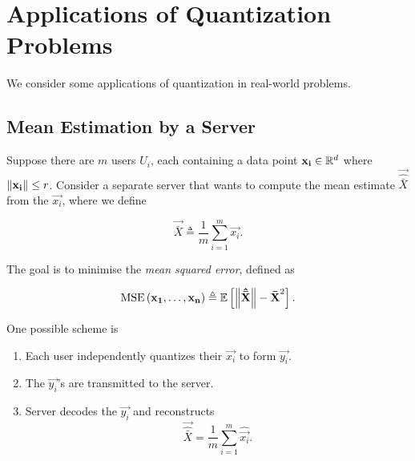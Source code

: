 \documentclass[twoside]{article}
\begin{document}



\section{Applications of Quantization Problems}

We consider some applications of quantization in real-world problems.

\subsection{Mean Estimation by a Server}

Suppose there are \(m\) users \(U_i\), each containing a data point \(\boldsymbol{\mathbf{x_i}}
\in \mathbb R^d\) where \(\left\lVert\boldsymbol{\mathbf{x_i}}\right\rVert \le r\). Consider a separate server that
wants to compute the mean estimate \(\vec{\hat{\bar{X}}}\) from the \(\vec{x_i}\),
where we define

\begin{equation}
    \vec{\bar{X}} \triangleq \frac{1}{m}\sum_{i=1}^m \vec{x_i}.
    \label{eq:Xbar-def}
\end{equation}

The goal is to minimise the \emph{mean squared error}, defined as

\begin{equation}
    \mathrm{MSE}\left(\boldsymbol{\mathbf{x_1}},\ldots,\boldsymbol{\mathbf{x_n}}\right) \triangleq \mathbb{E}\left[ \left\lVert\boldsymbol{\mathbf{\hat{\bar{X}}}}\right\rVert - \boldsymbol{\mathbf{\bar{X}}}^2 \right].
    \label{eq:mse-def}
\end{equation}

One possible scheme is

\begin{enumerate}
    \item Each user independently quantizes their \(\vec{x_i}\) to form
    \(\vec{y_i}\).
    \item The \(\vec{y_i}\)'s are transmitted to the server.
    \item Server decodes the \(\vec{y_i}\) and reconstructs
        \begin{equation}
            \vec{\hat{\bar{X}}} = \frac{1}{m}\sum_{i=1}^m \hat{\vec{x_i}}.
            \label{eq:srv-mean}
        \end{equation}
\end{enumerate}
\end{document}
